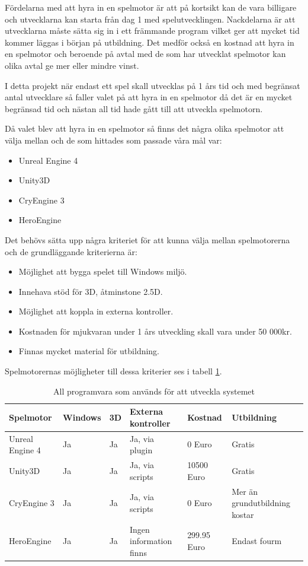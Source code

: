 \documentclass[a4paper,12pt,oneside,final]{extbook}
\begin{document}
Fördelarna med att hyra in en spelmotor är att på kortsikt kan de vara billigare och utvecklarna kan starta från dag 1 med spelutvecklingen. Nackdelarna är att utvecklarna måste sätta sig in i ett främmande program vilket ger att mycket tid kommer läggas i början på utbildning. Det medför också en kostnad att hyra in en spelmotor och beroende på avtal med de som har utvecklat spelmotor kan olika avtal ge mer eller mindre vinst.

I detta projekt när endast ett spel skall utvecklas på 1 års tid och med begränsat antal utvecklare så faller valet på att hyra in en spelmotor då det är en mycket begränsad tid och nästan all tid hade gått till att utveckla spelmotorn. 

Då valet blev att hyra in en spelmotor så finns det några olika spelmotor att välja mellan och de som hittades som passade våra mål var:

\begin{itemize}
	\item Unreal Engine 4
	\item Unity3D
	\item CryEngine 3
	\item HeroEngine
	
\end{itemize}

Det behövs sätta upp några kriteriet för att kunna välja mellan spelmotorerna och de grundläggande kriterierna är:
\begin{itemize}
	\item Möjlighet att bygga spelet till Windows miljö.
	\item Innehava stöd för 3D, åtminstone 2.5D.
	\item Möjlighet att koppla in externa kontroller.
	\item Kostnaden för mjukvaran under 1 års utveckling skall vara under 50 000kr.
	\item Finnas mycket material för utbildning.
	
\end{itemize}
Spelmotorernas möjligheter till dessa kriterier ses i tabell \ref{Spelmotorer}.

\begin{table}[h]
	\centering
	\caption{All programvara som används för att utveckla systemet}
	\label{Spelmotorer}
	\begin{tabular}{ | p{6em} | m{6em} |p{1em}| p{8em} |p{6em} |p{8em} |} 
		\hline
		\textbf{Spelmotor}&\textbf{Windows}  &\textbf{3D}&\textbf{Externa kontroller}&\textbf{Kostnad}&\textbf{Utbildning} \\ 
		\hline
		Unreal Engine 4 & Ja&Ja & Ja, via plugin&0 Euro&Gratis  \\ 
		\hline
		Unity3D &Ja &Ja&Ja, via scripts&10500 Euro&Gratis \\ 
		\hline
		CryEngine 3 &Ja& Ja &Ja, via scripts &0 Euro&Mer än grundutbildning kostar \\ 
		\hline
		HeroEngine &Ja&Ja &Ingen information finns&299.95 Euro&Endast fourm \\ 
		\hline
		
	\end{tabular}
\end{table}
\end{document}
